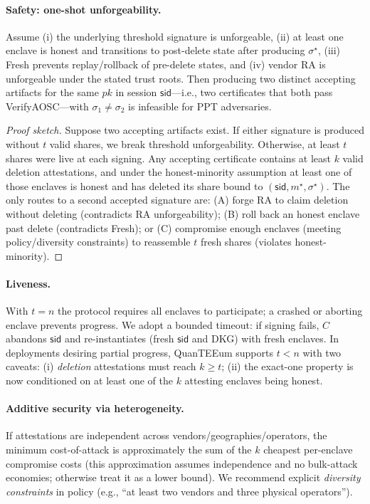 \documentclass[runningheads,orivec]{llncs}
\newcommand{\prot}{\textsf{QuanTEEum}}
\newcommand{\sid}{\mathsf{sid}}
\begin{document}
\paragraph{Safety: one-shot unforgeability.}
\begin{theorem}\label{thm:one-shot}
Assume (i) the underlying threshold signature is unforgeable, (ii) at least one enclave is honest and transitions to post-delete state after producing $\sigma^{\star}$, (iii) \textsf{Fresh} prevents replay/rollback of pre-delete states, and (iv) vendor RA is unforgeable under the stated trust roots. Then producing two distinct accepting artifacts for the same $pk$ in session $\mathsf{sid}$—i.e., two certificates that both pass \textsf{VerifyAOSC}—with $\sigma_1 \neq \sigma_2$ is infeasible for PPT adversaries.
\end{theorem}

\begin{proof}[Proof sketch]
Suppose two accepting artifacts exist. If either signature is produced without $t$ valid shares, we break threshold unforgeability. Otherwise, at least $t$ shares were live at each signing. Any accepting certificate contains at least $k$ valid deletion attestations, and under the honest-minority assumption at least one of those enclaves is honest and has deleted its share bound to $(\mathsf{sid},m^{\star},\sigma^{\star})$. The only routes to a second accepted signature are: (A) forge RA to claim deletion without deleting (contradicts RA unforgeability); (B) roll back an honest enclave past delete (contradicts \textsf{Fresh}); or (C) compromise enough enclaves (meeting policy/diversity constraints) to reassemble $t$ fresh shares (violates honest-minority).
\end{proof}

\paragraph{Liveness.}
With $t{=}n$ the protocol requires all enclaves to participate; a crashed or aborting enclave prevents progress. We adopt a bounded timeout: if signing fails, $C$ abandons $\sid$ and re-instantiates (fresh $\sid$ and DKG) with fresh enclaves. In deployments desiring partial progress, \prot{} supports $t<n$ with two caveats: (i) \emph{deletion} attestations must reach $k\!\ge\!t$; (ii) the exact-one property is now conditioned on at least one of the $k$ attesting enclaves being honest.

\paragraph{Additive security via heterogeneity.}
If attestations are independent across vendors/geographies/operators, the minimum cost\mbox{-}of\mbox{-}attack is approximately the sum of the $k$ cheapest per\mbox{-}enclave compromise costs (this approximation assumes independence and no bulk\mbox{-}attack economies; otherwise treat it as a lower bound). We recommend explicit \emph{diversity constraints} in policy (e.g., “at least two vendors and three physical operators”).
\end{document}
